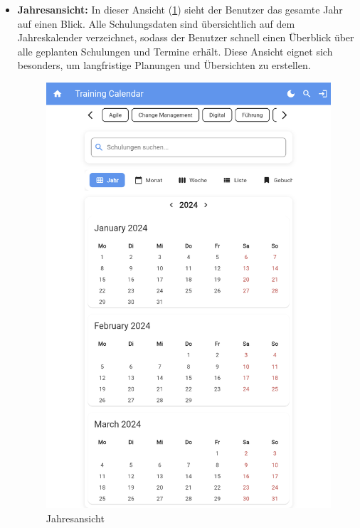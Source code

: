 \begin{itemize}
    \item \textbf{Jahresansicht:} In dieser Ansicht (\ref{Jahr}) sieht der Benutzer das gesamte Jahr auf einen Blick. Alle Schulungsdaten sind übersichtlich auf dem Jahreskalender verzeichnet, sodass der Benutzer schnell einen Überblick über alle geplanten Schulungen und Termine erhält. Diese Ansicht eignet sich besonders, um langfristige Planungen und Übersichten zu erstellen.
\begin{figure}[htbp!]
        \centering
        \includegraphics[scale=0.2]{img/flutter_01.png}
        \caption{ Jahresansicht}
        \label{Jahr}
    \end{figure}
  

\end{itemize}
